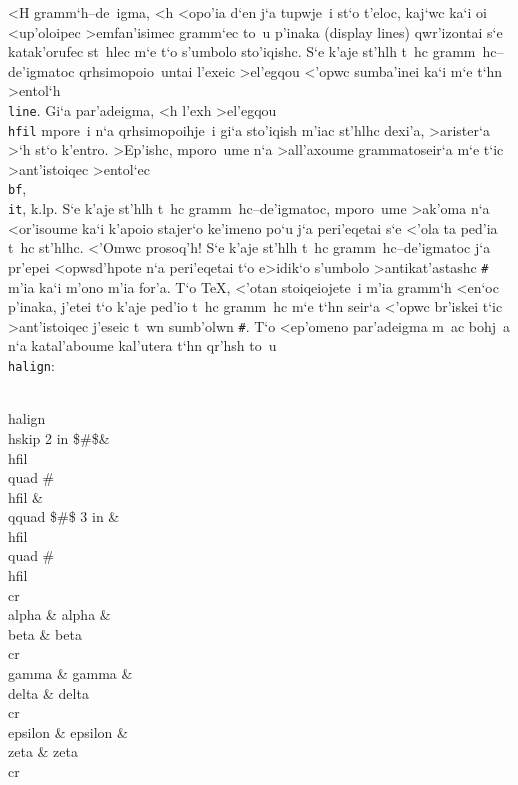 <H gramm`h--de~igma, <h <opo'ia d`en j`a tupwje~i st`o t'eloc, kaj`wc
ka`i oi <up'oloipec >emfan'isimec gramm`ec to~u p'inaka ({\rm display lines})
qwr'izontai s`e katak'orufec st~hlec m`e t`o s'umbolo
sto'i\-qi\-shc\NB{}{\tt\&}\null.  S`e k'aje st'hlh t~hc
gramm~hc--de'igmatoc qrhsimopoio~untai l'exeic >el'egqou <'opwc
sumba'inei ka`i m`e t`hn >entol`h  {\tt \\line\lb\rb}\null. Gi`a
par'adeigma, <h l'exh >el'egqou {\tt \\hfil} mpore~i n`a qrhsimopoihje~i
gi`a sto'iqish m'iac st'hlhc dexi'a, >arister`a >`h st`o k'entro.
>Ep'ishc, mporo~ume n`a >all'axoume grammatoseir`a m`e t`ic
>ant'istoiqec >entol`ec {\tt \\bf}, {\tt \\it}, k.lp.  S`e k'aje st'hlh
t~hc gramm~hc--de'igmatoc, mporo~ume >ak'oma n`a <or'isoume ka`i k'apoio
{\tengs stajer`o ke'imeno} po`u j`a peri'eqetai s`e <'ola ta ped'ia
t~hc st'hlhc.  <'Omwc prosoq'h!  S`e k'aje st'hlh t~hc
gramm~hc--de'igmatoc j`a pr'epei <opwsd'hpote n`a peri'eqetai t`o
e>idik`o {\tengs s'umbolo >antikat'astashc} {\tt \#} m'ia ka`i m'ono
m'ia for'a. T`o {\rm \TeX}, <'otan stoiqeiojete~i m'ia gramm`h <en`oc
p'inaka, j'etei t`o k'aje ped'io t~hc gramm~hc m`e t`hn seir`a
<'opwc br'iskei t`ic >ant'istoiqec j'eseic t~wn sumb'olwn {\tt \#}\null.
T`o <ep'omeno par'adeigma m~ac bohj~a n`a katal'aboume kal'utera t`hn
qr'hsh to~u {\tt \\halign}:

\beginuser
\\halign\lb\\hskip 2 in \$\#\$\& \\hfil \\quad \# \\hfil \& \\qquad \$\#\$ 
\hfill 3 in \& \\hfil \\quad \# \\hfil \\cr
\\alpha   \& alpha   \& \\beta  \& beta  \\cr
\\gamma   \& gamma   \& \\delta \& delta \\cr
\\epsilon \& epsilon \& \\zeta  \& zeta  \\cr
\rb
\enduser

